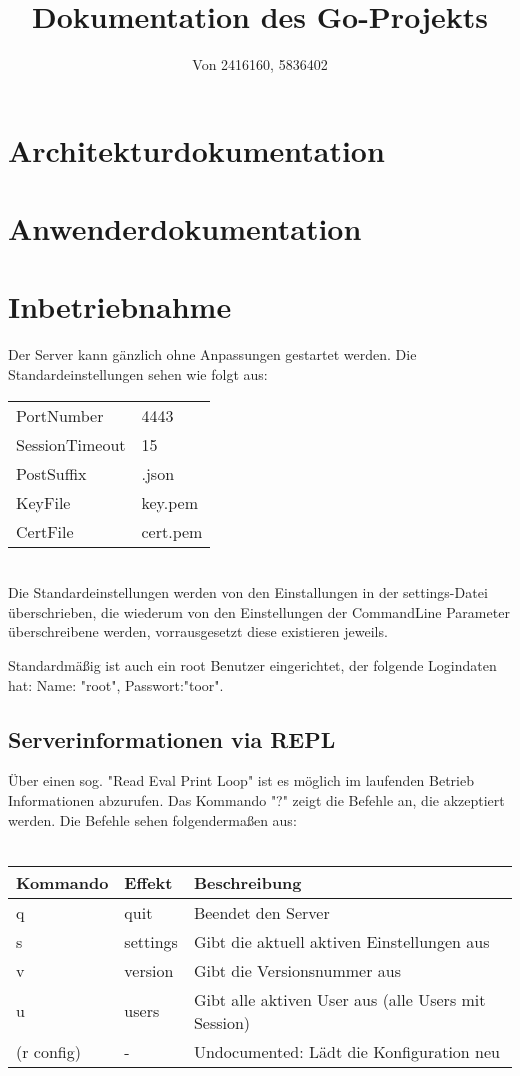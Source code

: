 \documentclass[10pt]{article}
\title{Dokumentation des Go-Projekts}
\author{Von 2416160, 5836402}
\date{}
\begin{document}
\maketitle
	\section{Architekturdokumentation}
	\section{Anwenderdokumentation}
	\section{Inbetriebnahme}
		Der Server kann g\"anzlich ohne Anpassungen gestartet werden.
		Die Standardeinstellungen sehen wie folgt aus:
		\begin{tabular}{l|l}
			PortNumber &     4443\\
			SessionTimeout & 15\\
			PostSuffix & .json\\
			KeyFile & key.pem\\
			CertFile & cert.pem\\
		\end{tabular}\\
		Die Standardeinstellungen werden von den Einstallungen in der settings-Datei \"uberschrieben, die wiederum von den Einstellungen der CommandLine Parameter \"uberschreibene werden, vorrausgesetzt diese existieren jeweils.
		
		Standardm\"a{\ss}ig ist auch ein root Benutzer eingerichtet, der folgende Logindaten hat: Name: "root", Passwort:"toor".
		\subsection{Serverinformationen via REPL}
		\"Uber einen sog. "Read Eval Print Loop" ist es m\"oglich im laufenden Betrieb Informationen abzurufen.
		Das Kommando "?" zeigt die Befehle an, die akzeptiert werden. Die Befehle sehen folgenderma{\ss}en aus:\\\\
		\begin{tabular}{l|l|l}
			Kommando   & Effekt   & Beschreibung\\
			\hline
			q          & quit     & Beendet den Server\\
			s          & settings & Gibt die aktuell aktiven Einstellungen aus\\
			v          & version  & Gibt die Versionsnummer aus\\
			u          & users    & Gibt alle aktiven User aus (alle Users mit Session)\\
			(r config) & -        & Undocumented: L\"adt die Konfiguration neu
		\end{tabular}
\end{document}
